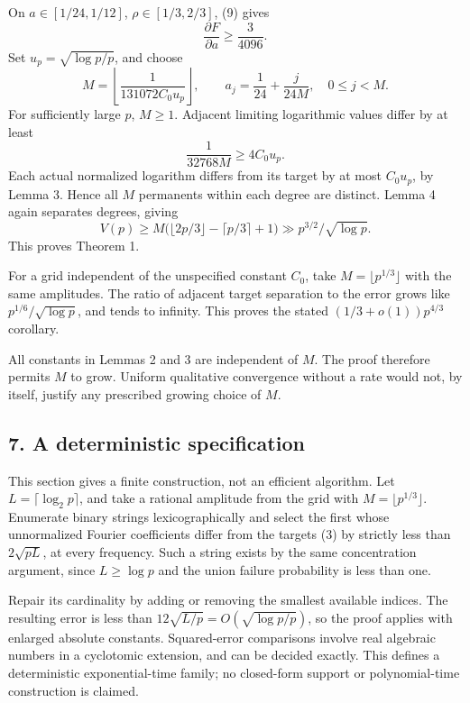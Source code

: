 \documentclass[
  11pt,
]{article}
\begin{document}
On \(a\in[1/24,1/12]\), \(\rho\in[1/3,2/3]\), (9) gives \[
 \frac{\partial F}{\partial a}\ge\frac{3}{4096}.            \tag{10}
\] Set \(u_p=\sqrt{\log p/p}\), and choose \[
 M=\left\lfloor\frac{1}{131072 C_0u_p}\right\rfloor,
 \qquad a_j=\frac1{24}+\frac{j}{24M},\quad0\le j<M.
\] For sufficiently large \(p\), \(M\ge1\). Adjacent limiting
logarithmic values differ by at least \[
 \frac{1}{32768M}\ge4C_0u_p.
\] Each actual normalized logarithm differs from its target by at most
\(C_0u_p\), by Lemma 3. Hence all \(M\) permanents within each degree
are distinct. Lemma 4 again separates degrees, giving \[
 V(p)\ge M\bigl(\lfloor2p/3\rfloor-\lceil p/3\rceil+1\bigr)
       \gg p^{3/2}/\sqrt{\log p}.
\] This proves Theorem 1.

For a grid independent of the unspecified constant \(C_0\), take
\(M=\lfloor p^{1/3}\rfloor\) with the same amplitudes. The ratio of
adjacent target separation to the error grows like
\(p^{1/6}/\sqrt{\log p}\), and tends to infinity. This proves the stated
\((1/3+o(1))p^{4/3}\) corollary.

All constants in Lemmas 2 and 3 are independent of \(M\). The proof
therefore permits \(M\) to grow. Uniform qualitative convergence without
a rate would not, by itself, justify any prescribed growing choice of
\(M\).

\subsection{7. A deterministic
specification}\label{a-deterministic-specification}

This section gives a finite construction, not an efficient algorithm.
Let \(L=\lceil\log_2p\rceil\), and take a rational amplitude from the
grid with \(M=\lfloor p^{1/3}\rfloor\). Enumerate binary strings
lexicographically and select the first whose unnormalized Fourier
coefficients differ from the targets (3) by strictly less than
\(2\sqrt{pL}\), at every frequency. Such a string exists by the same
concentration argument, since \(L\ge\log p\) and the union failure
probability is less than one.

Repair its cardinality by adding or removing the smallest available
indices. The resulting error is less than
\(12\sqrt{L/p}=O(\sqrt{\log p/p})\), so the proof applies with enlarged
absolute constants. Squared-error comparisons involve real algebraic
numbers in a cyclotomic extension, and can be decided exactly. This
defines a deterministic exponential-time family; no closed-form support
or polynomial-time construction is claimed.
\end{document}
